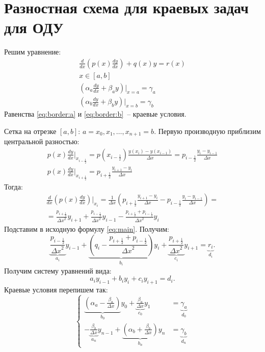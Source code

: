 \documentclass[10pt]{article}
\newcommand{\half}{\ensuremath{\frac{1}{2}}}
\begin{document}
\section{Разностная схема для краевых задач для ОДУ}
	Решим уравнение:
	\begin{gather}
		\frac{d}{dx} (p(x) \frac{dy}{dx}) + q(x)y = r(x)\label{eq:main}\\
		x \in [a, b] \\
		(\alpha_a \frac{dy}{dx} + \beta_a y) \vert_{x=a} = \gamma_a \label{eq:border:a} \\
		(\alpha_b \frac{dy}{dx} + \beta_b y) \vert_{x=b} = \gamma_b \label{eq:border:b}
	\end{gather}
	Равенства \ref{eq:border:a} и \ref{eq:border:b}~-- краевые условия.

	Сетка на отрезке $[a, b]$: $a = x_0, x_1, \dotsc, x_{n+1} = b$. Первую производную приблизим центральной разностью:
	\begin{gather}
		p(x) \frac{dy}{dx} \vert_{x_{i-\half}} = p(x_{i-\half}) \frac{y(x_i) - y(x_{i-1})}{\Delta x} 
		                                             = p_{i-\half} \frac{y_i - y_{i-1}}{\Delta x} \\
		p(x) \frac{dy}{dx} \vert_{x_{i+\half}} = p_{i+\half} \frac{y_{i+1} - y_i}{\Delta x}
	\end{gather}
	Тогда:
	\begin{gather}
		\frac{d}{dx} (p(x) \frac{dy}{dx}) \vert_{x_i} = 
		\frac{1}{\Delta x} (p_{i+\half} \frac{y_{i+1} - y_i}{\Delta x} - p_{i-\half} \frac{y_i - y_{i-1}}{\Delta x}) = \\
		= \frac{p_{i + \half}}{{\Delta x}^2} y_{i+1} + \frac{p_{i - \half}}{{\Delta x}^2} y_{i-1} - \frac{p_{i + \half} + p_{i - \half}}{{\Delta x}^2} y_{i}
	\end{gather}
	Подставим в исходную формулу \ref{eq:main}. Получим:
	\begin{equation}\label{eq:abc}
		\underbrace{\frac{p_{i - \half}}{{\Delta x}^2}}_{a_i} y_{i-1} + 
		\underbrace{(q_i - \frac{p_{i + \half} + p_{i - \half}}{{\Delta x}^2})}_{b_i} y_{i} + 
		\underbrace{\frac{p_{i + \half}}{{\Delta x}^2}}_{c_i} y_{i+1} = \underbrace{r_i}_{d_i}. 
	\end{equation}
	Получим систему уравнений вида:
	\begin{equation}
		a_i y_{i-1} + b_i y_{i} + c_i y_{i + 1} = d_i.
	\end{equation}
	Краевые условия перепишем так:
	\begin{equation*}
		\left\{
			\begin{aligned}
				\underbrace{(\alpha_a - \frac{\beta_a}{\Delta x})}_{b_0}y_0 + 
				\underbrace{\frac{\beta_a}{\Delta x}}_{c_0}y_1 &= \underbrace{\gamma_a}_{d_0} \\
			  - \underbrace{\frac{\beta_b}{\Delta x}}_{a_n}y_{n-1} + 
				\underbrace{(\alpha_b + \frac{\beta_b}{\Delta x})}_{b_n}y_n  &= \underbrace{\gamma_b}_{d_n}
			\end{aligned}
		\right.
	\end{equation*}
\end{document}
